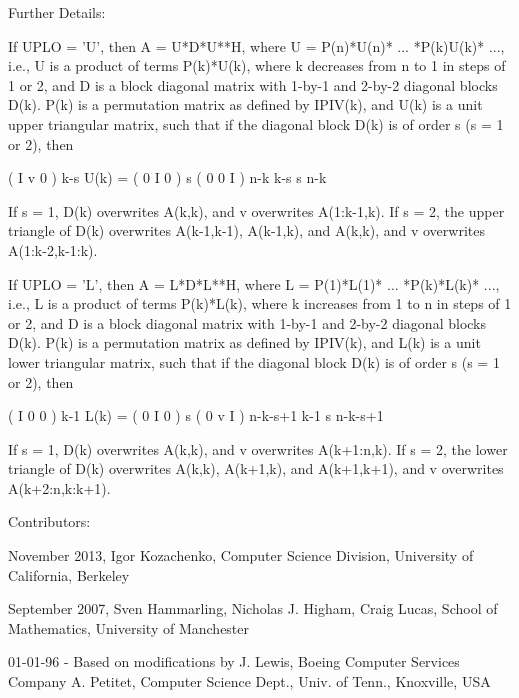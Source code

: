 \begin{DoxyParagraph}{Further Details\+: }
\begin{DoxyVerb}  If UPLO = 'U', then A = U*D*U**H, where
     U = P(n)*U(n)* ... *P(k)U(k)* ...,
  i.e., U is a product of terms P(k)*U(k), where k decreases from n to
  1 in steps of 1 or 2, and D is a block diagonal matrix with 1-by-1
  and 2-by-2 diagonal blocks D(k).  P(k) is a permutation matrix as
  defined by IPIV(k), and U(k) is a unit upper triangular matrix, such
  that if the diagonal block D(k) is of order s (s = 1 or 2), then

             (   I    v    0   )   k-s
     U(k) =  (   0    I    0   )   s
             (   0    0    I   )   n-k
                k-s   s   n-k

  If s = 1, D(k) overwrites A(k,k), and v overwrites A(1:k-1,k).
  If s = 2, the upper triangle of D(k) overwrites A(k-1,k-1), A(k-1,k),
  and A(k,k), and v overwrites A(1:k-2,k-1:k).

  If UPLO = 'L', then A = L*D*L**H, where
     L = P(1)*L(1)* ... *P(k)*L(k)* ...,
  i.e., L is a product of terms P(k)*L(k), where k increases from 1 to
  n in steps of 1 or 2, and D is a block diagonal matrix with 1-by-1
  and 2-by-2 diagonal blocks D(k).  P(k) is a permutation matrix as
  defined by IPIV(k), and L(k) is a unit lower triangular matrix, such
  that if the diagonal block D(k) is of order s (s = 1 or 2), then

             (   I    0     0   )  k-1
     L(k) =  (   0    I     0   )  s
             (   0    v     I   )  n-k-s+1
                k-1   s  n-k-s+1

  If s = 1, D(k) overwrites A(k,k), and v overwrites A(k+1:n,k).
  If s = 2, the lower triangle of D(k) overwrites A(k,k), A(k+1,k),
  and A(k+1,k+1), and v overwrites A(k+2:n,k:k+1).\end{DoxyVerb}
 
\end{DoxyParagraph}
\begin{DoxyParagraph}{Contributors\+: }
\begin{DoxyVerb}  November 2013,  Igor Kozachenko,
                  Computer Science Division,
                  University of California, Berkeley

  September 2007, Sven Hammarling, Nicholas J. Higham, Craig Lucas,
                  School of Mathematics,
                  University of Manchester

  01-01-96 - Based on modifications by
    J. Lewis, Boeing Computer Services Company
    A. Petitet, Computer Science Dept., Univ. of Tenn., Knoxville, USA\end{DoxyVerb}
 
\end{DoxyParagraph}
